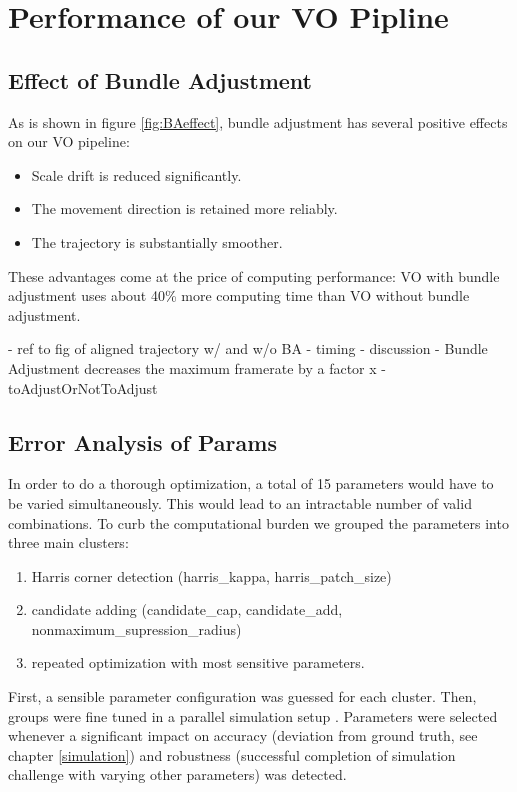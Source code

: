 \chapter{Performance of our VO Pipline}
\label{performance}

\section{Effect of Bundle Adjustment}

As is shown in figure \ref{fig:BAeffect}, bundle adjustment has several positive effects on our VO pipeline:

\begin{itemize}
	\item Scale drift is reduced significantly.
	\item The movement direction is retained more reliably.
	\item The trajectory is substantially smoother.
\end{itemize}

These advantages come at the price of computing performance: VO with bundle adjustment uses about 40\% more computing time than VO without bundle adjustment.

- ref to fig of aligned trajectory w/ and w/o BA
- timing 
- discussion
- Bundle Adjustment decreases the maximum framerate by a factor x
- toAdjustOrNotToAdjust

\section{Error Analysis of Params}

In order to do a thorough optimization, a total of 15 parameters would have to be varied simultaneously. 
This would lead to an intractable number of valid combinations. To curb the computational burden we grouped the parameters into three main clusters:

\begin{enumerate}
    \item Harris corner detection (harris\_kappa, harris\_patch\_size)
    \item candidate adding (candidate\_cap, candidate\_add, nonmaximum\_supression\_radius)
    \item repeated optimization with most sensitive parameters.
\end{enumerate}

First, a sensible parameter configuration was guessed for each cluster. Then, groups were fine tuned in a parallel simulation setup . Parameters were selected whenever a significant impact on accuracy (deviation from ground truth, see chapter \ref{simulation}) and robustness (successful completion of simulation challenge with varying other parameters) was detected.

